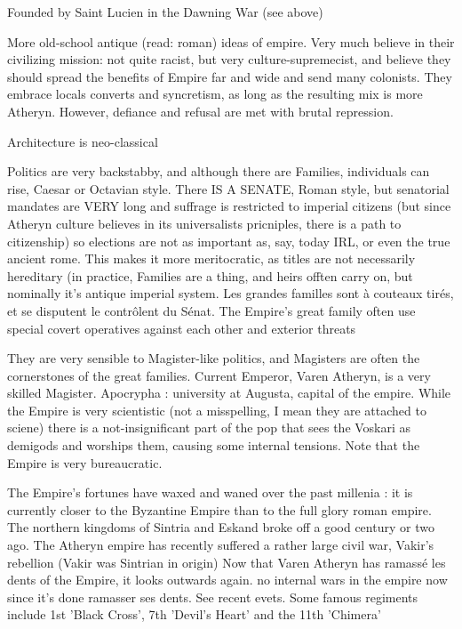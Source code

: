 Founded by Saint Lucien in the Dawning War (see above)

More old-school antique (read: roman) ideas of empire. Very much believe in their civilizing mission: not quite racist, but very culture-supremecist, and believe they should spread the benefits of Empire far and wide and send many colonists. They embrace locals converts and syncretism, as long as the resulting mix is more Atheryn. However, defiance and refusal are met with brutal repression. 

Architecture is neo-classical

Politics are very backstabby, and although there are Families, individuals can rise, Caesar or Octavian style. There IS A SENATE, Roman style, but senatorial mandates are VERY long and suffrage is restricted to imperial citizens (but since Atheryn culture believes in its universalists pricniples, there is a path to citizenship) so elections are not as important as, say, today IRL, or even the true ancient rome. This makes it more meritocratic, as titles are not necessarily hereditary (in practice, Families are a thing, and heirs offten carry on, but nominally it's antique imperial system. Les grandes familles sont à couteaux tirés, et se disputent le contrôlent du Sénat. The Empire's great family often use special covert operatives against each other and exterior threats 

They are very sensible to Magister-like politics, and Magisters are often the cornerstones of the great families. Current Emperor, Varen Atheryn, is a very skilled Magister. Apocrypha : university at Augusta, capital of the empire. While the Empire is very scientistic (not a misspelling, I mean they are attached to sciene) there is a not-insignificant part of the pop that sees the Voskari as demigods and worships them, causing some internal tensions.
Note that the Empire is very bureaucratic. 

The Empire's fortunes have waxed and waned over the past millenia : it is currently closer to the Byzantine Empire than to the full glory roman empire. The northern kingdoms of Sintria and Eskand broke off a good century or two ago. The Atheryn empire has recently suffered a rather large civil war, Vakir's rebellion (Vakir was Sintrian in origin) Now that Varen Atheryn has ramassé les dents of the Empire, it looks outwards again.  no internal wars in the empire now since it's done ramasser ses dents. See recent evets. Some famous regiments include 1st 'Black Cross', 7th 'Devil's Heart' and the 11th 'Chimera'


